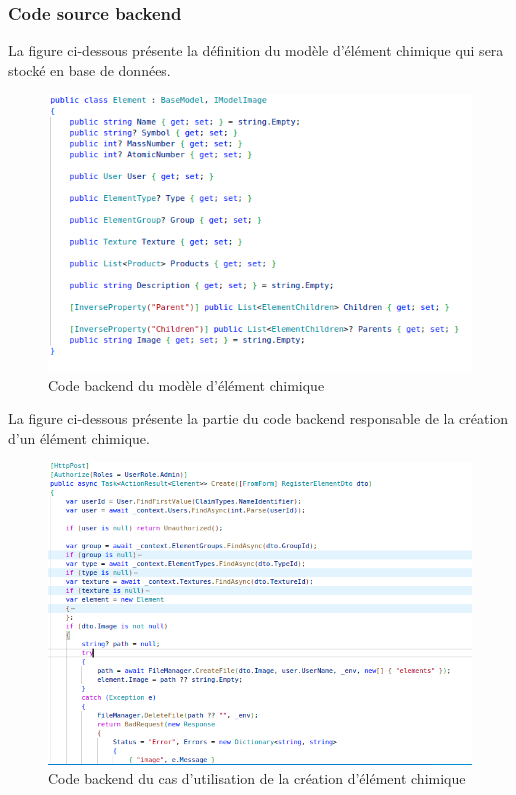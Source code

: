 \subsubsection{Code source backend}

La figure ci-dessous présente la définition du modèle d'élément chimique qui sera stocké en base de données.

\begin{figure}[H]
	\centering
	\includegraphics[width=1\textwidth]{img/met}
	\caption{Code backend du modèle d'élément chimique}
	\label{fig:mesh1}
\end{figure}

La figure ci-dessous présente la partie du code backend responsable de la création d'un élément chimique.
\begin{figure}[H]
	\centering
	\includegraphics[width=1\textwidth]{img/cep}
	\caption{Code backend du cas d'utilisation de la création d'élément chimique}
	\label{fig:mesh1}
\end{figure}


